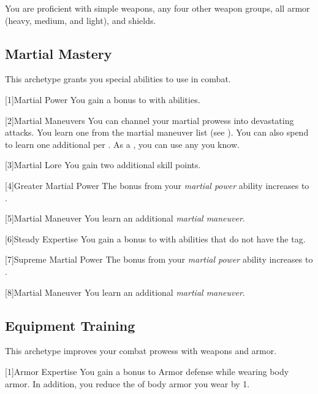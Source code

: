         You are proficient with simple weapons, any four other weapon groups, all armor (heavy, medium, and light), and shields.

    \subsection{Martial Mastery}
        This archetype grants you special abilities to use in combat.

        [1]{Martial Power} You gain a  bonus to  with  abilities.

        [2]{Martial Maneuvers}
        You can channel your martial prowess into devastating attacks.
        You learn one  from the martial maneuver list (see ).
        You can also spend  to learn one additional  per .
        As a , you can use any  you know.

        [3]{Martial Lore} You gain two additional skill points.

        [4]{Greater Martial Power} The bonus from your \textit{martial power} ability increases to .

        [5]{Martial Maneuver}
        You learn an additional \textit{martial maneuver}.

        [6]{Steady Expertise} You gain a  bonus to  with  abilities that do not have the  tag.

        [7]{Supreme Martial Power} The bonus from your \textit{martial power} ability increases to .

        [8]{Martial Maneuver}
        You learn an additional \textit{martial maneuver}.

    \subsection{Equipment Training}
        This archetype improves your combat prowess with weapons and armor.

        [1]{Armor Expertise}
        You gain a  bonus to Armor defense while wearing body armor.
        In addition, you reduce the  of body armor you wear by 1.

